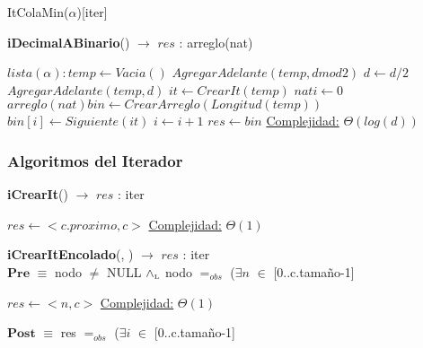 \begin{Estructura}{ItColaMin($\alpha$)}[iter]
\begin{algorithm}[H]{\textbf{iDecimalABinario}{(}) $\to$ $res$ : arreglo(nat)}
   	\begin{algorithmic}[1]
		\State $lista(\alpha): temp \gets Vacia() $ 
			\State $AgregarAdelante(temp, d mod 2)$ 			
			\State $d \gets d/2$ 			
		\EndWhile
		\State $AgregarAdelante(temp, d)$ 
		\State $it \gets CrearIt(temp)$ 					
		\State $nat i \gets 0$ 
		\State $arreglo(nat) bin \gets CrearArreglo(Longitud(temp)) $ 		
			\State $bin[i] \gets Siguiente(it)$ 			
			\State $i \gets i+1$ 			
		\EndWhile
		\State $res \gets bin$ 
		\Statex \underline{Complejidad:} $\Theta(log(d))$
   	\end{algorithmic}
\end{algorithm}    

\subsubsection{Algoritmos del Iterador}

\begin{algorithm}[H]{\textbf{iCrearIt}() $\to$ $res$ : iter}
   	\begin{algorithmic}[1]
			\State $res \gets <c.proximo, c>$ 
			\Statex \underline{Complejidad:} $\Theta(1)$
   	\end{algorithmic}
\end{algorithm}    	

\begin{algorithm}[H]{\textbf{iCrearItEncolado}(, ) $\to$ $res$ : iter} 
	{\\ $\textbf{Pre}$ $\equiv$ nodo $\neq$ NULL $\land_{\mathrm{\scriptscriptstyle{L}}}$ nodo $=_{obs}$ ($\exists n$ $\in$ [0..c.tamaño-1] }
   	\begin{algorithmic}[1]
			\State $res \gets <n, c>$ 
			\Statex \underline{Complejidad:} $\Theta(1)$
   	\end{algorithmic}
   	{ $\textbf{Post}$ $\equiv$ res $=_{obs}$ ($\exists i$ $\in$ [0..c.tamaño-1] }
\end{algorithm}    	



\end{Estructura}
